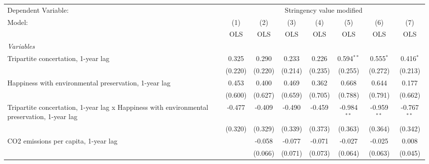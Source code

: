 
\begingroup
\centering
\begin{tabular}{lccccccc}
   \toprule
   Dependent Variable: & \multicolumn{7}{c}{Stringency value modified}\\
   Model:                                                                                      & (1)     & (2)     & (3)          & (4)           & (5)           & (6)           & (7)\\  
                                                                                               &  OLS    & OLS     & OLS          & OLS           & OLS           & OLS           & OLS\\  
   \midrule
   \emph{Variables}\\
   Tripartite concertation, 1-year lag                                                         & 0.325   & 0.290   & 0.233        & 0.226         & 0.594$^{**}$  & 0.555$^{*}$   & 0.416$^{*}$\\   
                                                                                               & (0.220) & (0.220) & (0.214)      & (0.235)       & (0.255)       & (0.272)       & (0.213)\\   
   Happiness with environmental preservation, 1-year lag                                       & 0.453   & 0.400   & 0.469        & 0.362         & 0.668         & 0.644         & 0.177\\   
                                                                                               & (0.600) & (0.627) & (0.659)      & (0.705)       & (0.788)       & (0.791)       & (0.662)\\   
   Tripartite concertation, 1-year lag x Happiness with environmental preservation, 1-year lag & -0.477  & -0.409  & -0.490       & -0.459        & -0.984$^{**}$ & -0.959$^{**}$ & -0.767$^{**}$\\   
                                                                                               & (0.320) & (0.329) & (0.339)      & (0.373)       & (0.363)       & (0.364)       & (0.342)\\   
   CO2 emissions per capita, 1-year lag                                                        &         & -0.058  & -0.077       & -0.071        & -0.027        & -0.025        & 0.008\\   
                                                                                               &         & (0.066) & (0.071)      & (0.073)       & (0.064)       & (0.063)       & (0.045)\\   

\end{tabular}
